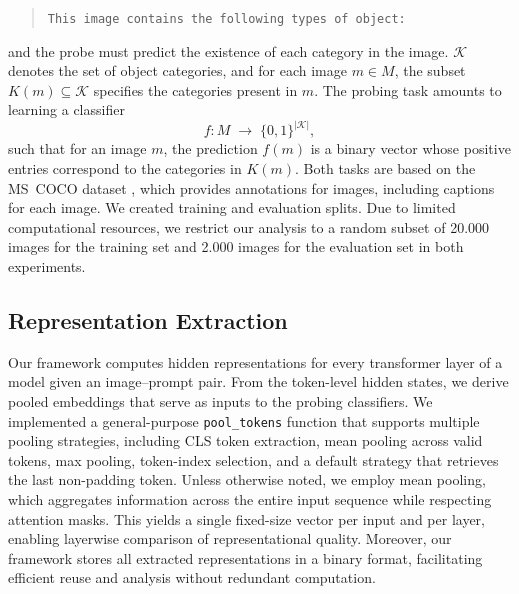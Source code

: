 \documentclass[11pt]{article}
\begin{document}
\begin{quote}
\texttt{This image contains the following types of object: }
\end{quote}
and the probe must predict the existence of each category in the image. $\mathcal{K}$ denotes the set of object categories, and for each image $m \in M$,
the subset $K(m) \subseteq \mathcal{K}$ specifies the categories present in $m$.
The probing task amounts to learning a classifier
\[
f : M \;\rightarrow\; \{0,1\} ^{|\mathcal{K}|},
\]
such that for an image $m$, the prediction $f(m)$ is a binary vector whose positive entries correspond to the categories in $K(m)$.
Both tasks are based on the MS~COCO dataset \cite{lin2014microsoft}, which provides annotations
for images, including captions for each image. We created
training and evaluation splits. Due to limited computational resources, we restrict our analysis to a random subset of 20.000 images for the training set and 2.000 images for the evaluation set in both experiments.



\subsection{Representation Extraction}
Our framework computes hidden representations for every transformer layer of a model
given an image--prompt pair. From the token-level hidden states, we derive pooled embeddings
that serve as inputs to the probing classifiers. We implemented a general-purpose
\texttt{pool\_tokens} function that supports multiple pooling strategies, including
CLS token extraction, mean pooling across valid tokens, max pooling, token-index selection,
and a default strategy that retrieves the last non-padding token. Unless otherwise noted,
we employ mean pooling, which aggregates information across the entire input sequence
while respecting attention masks. This yields a single fixed-size vector per input
and per layer, enabling layerwise comparison of representational quality.
Moreover, our framework stores all extracted representations in a binary format,
facilitating efficient reuse and analysis without redundant computation.
\end{document}
